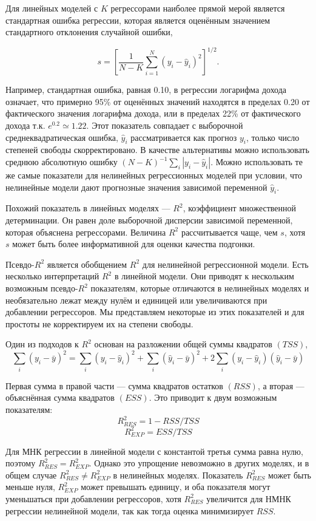 Для линейных моделей с $K$ регрессорами наиболее прямой мерой является стандартная ошибка регрессии, которая является оценённым значением стандартного отклонения случайной ошибки,

\[
s = \left[ \frac{1}{N - K} \sum_{i=1}^N (y_i - \hat{y}_i)^2 \right]^{1/2}.
\]

Например, стандартная ошибка, равная 0.10, в регрессии логарифма дохода означает, что примерно 95\% от оценённых значений находятся в пределах 0.20 от фактического значения логарифма дохода, или в пределах 22\% от фактического дохода т.к. $e^{0.2} \simeq 1.22$. Этот показатель совпадает с выборочной среднеквадратическая ошибка, $\hat{y}_i$ рассматривается как прогноз $y_i$, только число степеней свободы скорректировано. В качестве альтернативы можно использовать среднюю абсолютную ошибку $(N - K)^{-1}\sum_i |y_i - \hat{y}_i|$. Можно использовать те же самые показатели для нелинейных регрессионных моделей при условии, что нелинейные модели дают прогнозные значения зависимой переменной $\hat{y}_i$.

Похожий показатель в линейных моделях --- $R^2$, коэффициент множественной детерминации. Он равен доле выборочной дисперсии зависимой переменной, которая объяснена регрессорами. Величина $R^2$ рассчитывается чаще, чем $s$, хотя $s$ может быть более информативной для оценки качества подгонки.

Псевдо-$R^2$ является обобщением $R^2$ для нелинейной регрессионной модели. Есть несколько интерпретаций $R^2$ в линейной модели. Они приводят к нескольким возможным псевдо-$R^2$ показателям, которые отличаются в нелинейных моделях и необязательно  лежат между нулём и единицей или увеличиваются при добавлении регрессоров. Мы представляем некоторые из этих показателей и  для простоты не корректируем их на степени свободы.

Один из подходов к $R^2$ основан на  разложении общей суммы квадратов $(TSS)$, 
\[
\sum_{i} (y_i - \bar{y})^2 = \sum_{i} (y_i - \hat{y}_i)^2 + \sum_{i} (\hat{y}_i - \bar{y})^2 + 2\sum_{i} (y_i - \hat{y}_i)(\hat{y}_i - \bar{y})
\]

Первая сумма в правой части --- сумма квадратов остатков $(RSS)$, а вторая --- объяснённая сумма квадратов $(ESS)$. Это приводит к двум возможным показателям:
\[
R_{RES}^2 = 1 - RSS/TSS
\]
\[
R_{EXP}^2 = ESS/TSS
\]

Для МНК регрессии в линейной модели с константой третья сумма равна нулю, поэтому $R_{RES}^2 = R_{EXP}^2$. Однако это упрощение невозможно в других моделях, и в общем случае $R_{RES}^2 \not= R_{EXP}^2$ в нелинейных моделях. Показатель $R_{RES}^2$ может быть меньше нуля, $R_{EXP}^2$ может превышать единицу, и оба показателя могут уменьшаться при добавлении регрессоров, хотя $R_{RES}^2$ увеличится для НМНК регрессии нелинейной модели, так как тогда оценка минимизирует $RSS$.

